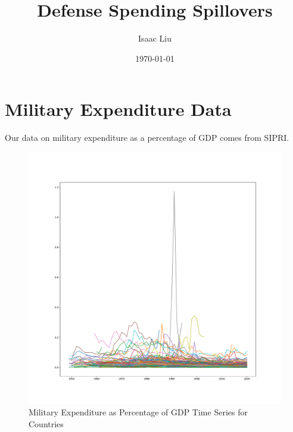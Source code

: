 \documentclass{report}
\title{Defense Spending Spillovers}
\author{Isaac Liu}
\date{\today}
\begin{document}
	\maketitle

	\newpage \clearpage

    \section*{Military Expenditure Data}

    Our data on military expenditure as a percentage of GDP comes from SIPRI.

	\begin{figure}[h!]
		\centering
		\caption{Military Expenditure as Percentage of GDP Time Series for Countries}
		\label{Milex_GDP_Time_Series}	
		\includegraphics[width=\linewidth,keepaspectratio=true]{../Output/Figures/Milex_GDP_Time_Series.pdf}
	\end{figure}
\end{document}
